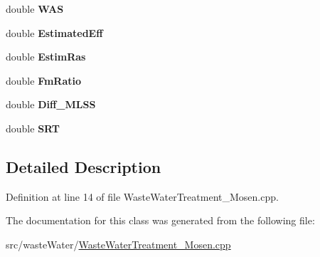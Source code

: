 \begin{DoxyCompactItemize}
double {\bfseries W\+AS}
\item 
\mbox{\label{classtable_of_calculations_afe6ebdf078f46155be995cb49276899f}} 
double {\bfseries Estimated\+Eff}
\item 
\mbox{\label{classtable_of_calculations_a2b171be574b4aae6c834f450b5536c80}} 
double {\bfseries Estim\+Ras}
\item 
\mbox{\label{classtable_of_calculations_a2e9f83ceaee51cf5ba5e25fadf8317c6}} 
double {\bfseries Fm\+Ratio}
\item 
\mbox{\label{classtable_of_calculations_afee4511ad78f6bca580b05af1d9a1f46}} 
double {\bfseries Diff\+\_\+\+M\+L\+SS}
\item 
\mbox{\label{classtable_of_calculations_afc3cee33b666c17ce612db5d6cc0714a}} 
double {\bfseries S\+RT}
\end{DoxyCompactItemize}


\subsection{Detailed Description}


Definition at line 14 of file Waste\+Water\+Treatment\+\_\+\+Mosen.\+cpp.



The documentation for this class was generated from the following file\+:\begin{DoxyCompactItemize}
\item 
src/waste\+Water/\hyperlink{_waste_water_treatment___mosen_8cpp}{Waste\+Water\+Treatment\+\_\+\+Mosen.\+cpp}\end{DoxyCompactItemize}
